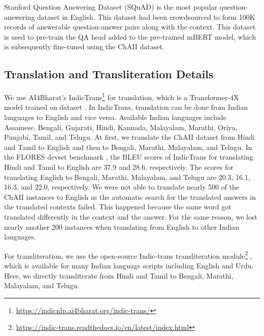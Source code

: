 \documentclass[11pt]{article}
\begin{document}
Stanford Question Answering Dataset (SQuAD) \cite{rajpurkar2016SQuAD} is the most popular question-answering dataset in English. This dataset had been crowdsourced to form 100K records of answerable question-answer pairs along with the context. This dataset is used to pre-train the QA head added to the pre-trained mBERT model, which is subsequently fine-tuned using the ChAII dataset.

\subsection{Translation and Transliteration Details}
We use AI4Bharat's IndicTrans\footnote{\url{https://indicnlp.ai4bharat.org/indic-trans/}} \cite{ramesh2021samanantar} for translation, which is a Transformer-4X model trained on  dataset \cite{ramesh2021samanantar}. In IndicTrans, translation can be done from Indian languages to English and vice versa. Available Indian languages include Assamese, Bengali, Gujarati, Hindi, Kannada, Malayalam, Marathi, Oriya, Punjabi, Tamil, and Telugu. At first, we translate the ChAII dataset from Hindi and Tamil to English and then to Bengali, Marathi, Malayalam, and Telugu. In the FLORES devset benchmark \cite{goyal2021flores}, the BLEU scores of IndicTrans for translating Hindi and Tamil to English are 37.9 and 28.6, respectively. The scores for translating English to Bengali, Marathi, Malayalam, and Telugu are 20.3, 16.1, 16.3, and 22.0, respectively. We were not able to translate nearly 500 of the ChAII instances to English as the automatic search for the translated answers in the translated contexts failed. This happened because the same word got translated differently in the context and the answer. For the same reason, we lost nearly another 200 instances when translating from English to other Indian languages.

For transliteration, we use the open-source Indic-trans transliteration module\footnote{\url{https://indic-trans.readthedocs.io/en/latest/index.html}} \cite{Bhat:2014:ISS:2824864.2824872}, which is available for many Indian language scripts including English and Urdu. Here, we directly transliterate from Hindi and Tamil to Bengali, Marathi, Malayalam, and Telugu.
\end{document}
